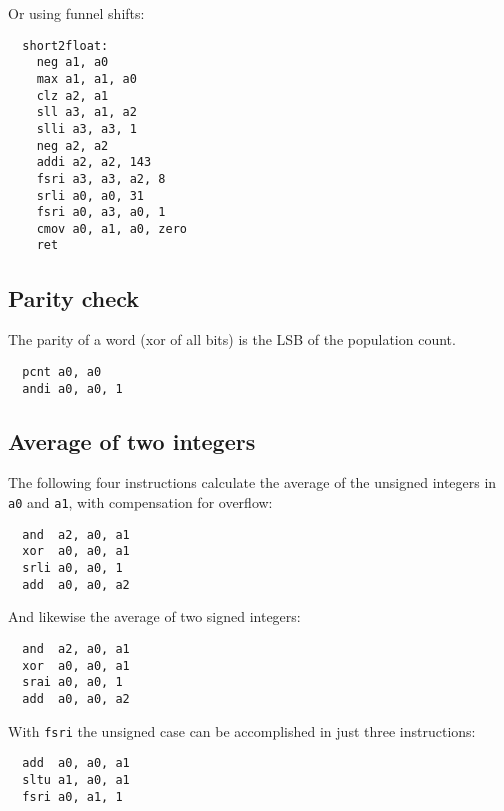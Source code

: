 Or using funnel shifts:

\begin{minipage}{\linewidth}
\begin{verbatim}
  short2float:
    neg a1, a0
    max a1, a1, a0
    clz a2, a1
    sll a3, a1, a2
    slli a3, a3, 1
    neg a2, a2
    addi a2, a2, 143
    fsri a3, a3, a2, 8
    srli a0, a0, 31
    fsri a0, a3, a0, 1
    cmov a0, a1, a0, zero
    ret
\end{verbatim}
\end{minipage}


\subsection{Parity check}

The parity of a word (xor of all bits) is the LSB of the population count.

\begin{verbatim}
  pcnt a0, a0
  andi a0, a0, 1
\end{verbatim}


\subsection{Average of two integers}

The following four instructions calculate the average of the unsigned
integers in {\tt a0} and {\tt a1}, with compensation for overflow:

\begin{verbatim}
  and  a2, a0, a1
  xor  a0, a0, a1
  srli a0, a0, 1
  add  a0, a0, a2
\end{verbatim}

And likewise the average of two signed integers:

\begin{verbatim}
  and  a2, a0, a1
  xor  a0, a0, a1
  srai a0, a0, 1
  add  a0, a0, a2
\end{verbatim}

With {\tt fsri} the unsigned case can be accomplished in just three
instructions:

\begin{verbatim}
  add  a0, a0, a1
  sltu a1, a0, a1
  fsri a0, a1, 1
\end{verbatim}

